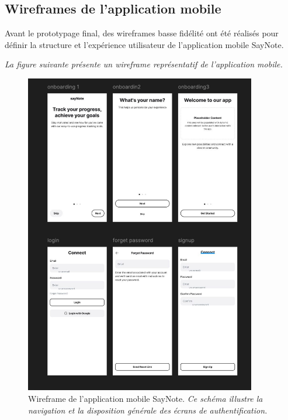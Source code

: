     
    
    \subsection{Wireframes de l'application mobile}
    
    Avant le prototypage final, des wireframes basse fidélité ont été réalisés pour définir la structure et l'expérience utilisateur de l'application mobile SayNote.
    
        \textit{La figure suivante présente un wireframe représentatif de l'application mobile.}
    \begin{figure}[H]
        \centering
        \includegraphics[width=0.9\textwidth]{assets/docs/mobile/wireframe_app-1.jpg}
        \caption{Wireframe de l'application mobile SayNote. \newline\textit{Ce schéma illustre la navigation et la disposition générale des écrans de authentification.}}
        \label{fig:wireframe_app_auth}
    \end{figure}
    
